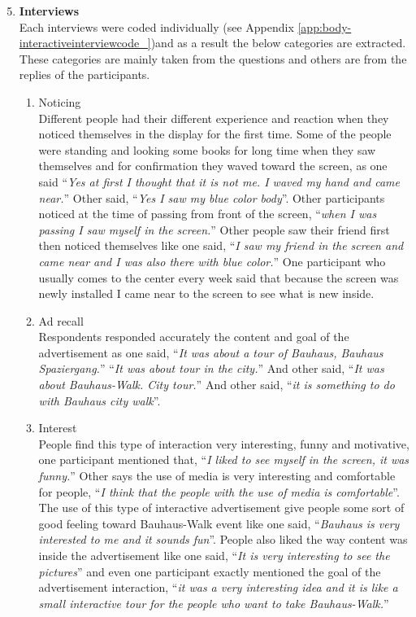 \begin{enumerate}
\setcounter{enumi}{4}
\item \textbf{Interviews} \\
Each interviews were coded individually (see Appendix \ref{app:body-interactiveinterviewcode_})and as a result the below categories are extracted. These categories are mainly taken from the questions and others are from the replies of the participants. 

\begin{enumerate}

\item Noticing \\
    Different people had their different experience and reaction when they noticed themselves in the display for the first time. Some of the people were standing and looking some books for long time when they saw themselves and for confirmation they waved toward the screen, as one said ``\emph{Yes at first I thought that it is not me. I waved my hand and came near.}'' Other said, ``\emph{Yes I saw my blue color body}''. Other participants noticed at the time of passing from front of the screen, ``\emph{when I was passing I saw myself in the screen.}'' Other people saw their friend first then noticed themselves like one said, ``\emph{I saw my friend in the screen and came near and I was also there with blue color.}'' One participant who usually comes to the center every week said that because the screen was newly installed I came near to the screen to see what is new inside.

\item Ad recall \\
    Respondents responded accurately the content and goal of the advertisement as one said, ``\emph{It was about a tour of Bauhaus, Bauhaus Spaziergang.}'' ``\emph{It was about tour in the city.}'' And other said, ``\emph{It was about Bauhaus-Walk. City tour.}'' And other said, ``\emph{it is something to do with Bauhaus city walk}''.

\item Interest \\
    People find this type of interaction very interesting, funny and motivative, one participant mentioned that, ``\emph{I liked to see myself in the screen, it was funny.}'' Other says the use of media is very interesting and comfortable for people, ``\emph{I think that the people with the use of media is comfortable}''. The use of this type of interactive advertisement give people some sort of good feeling toward Bauhaus-Walk event like one said, ``\emph{Bauhaus is very interested to me and it sounds fun}''. People also liked the way content was inside the advertisement like one said, ``\emph{It is very interesting to see the pictures}'' and even one participant exactly mentioned the goal of the advertisement interaction, ``\emph{it was a very interesting idea and it is like a small interactive tour for the people who want to take Bauhaus-Walk.}''


\end{enumerate}
\end{enumerate}
